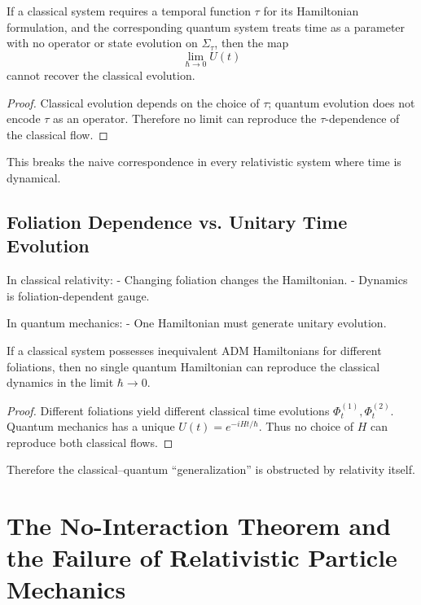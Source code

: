\documentclass[12pt,oneside]{book}
\begin{document}
\begin{theorem}
If a classical system requires a temporal function $\tau$ for its Hamiltonian formulation, and the corresponding quantum system treats time as a parameter with no operator or state evolution on $\Sigma_\tau$, then the map
\[
\lim_{\hbar\to 0} U(t)
\]
cannot recover the classical evolution.
\end{theorem}

\begin{proof}
Classical evolution depends on the choice of $\tau$; quantum evolution does not encode $\tau$ as an operator.  
Therefore no limit can reproduce the $\tau$-dependence of the classical flow.
\end{proof}

This breaks the naive correspondence in every relativistic system where time is dynamical.

\section{Foliation Dependence vs. Unitary Time Evolution}

In classical relativity:
- Changing foliation changes the Hamiltonian.
- Dynamics is foliation-dependent gauge.

In quantum mechanics:
- One Hamiltonian must generate unitary evolution.

\begin{theorem}
If a classical system possesses inequivalent ADM Hamiltonians for different foliations, then no single quantum Hamiltonian can reproduce the classical dynamics in the limit $\hbar \to 0$.
\end{theorem}

\begin{proof}
Different foliations yield different classical time evolutions $\Phi_t^{(1)},\Phi_t^{(2)}$.  
Quantum mechanics has a unique $U(t)=e^{-iHt/\hbar}$.  
Thus no choice of $H$ can reproduce both classical flows.
\end{proof}

Therefore the classical–quantum ``generalization'' is obstructed by relativity itself.


\chapter{The No-Interaction Theorem and the Failure of Relativistic Particle Mechanics}
\end{document}
